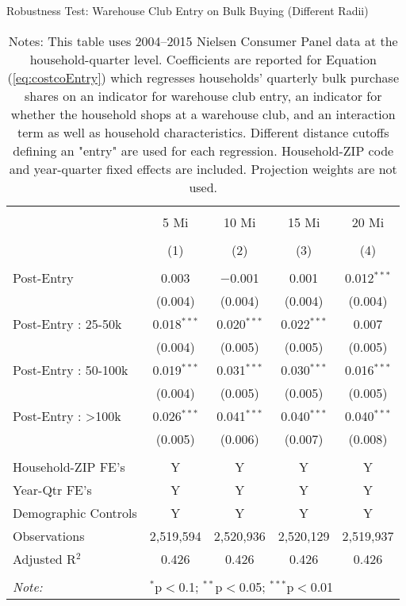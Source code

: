 \begin{table}[!htbp] \centering
  \caption{Robustness Test: Warehouse Club Entry on Bulk Buying (Different Radii)}
  \label{tab:appendixCostcoEntryDifferentRadii}
\begin{tabular}{@{\extracolsep{5pt}}lcccc}
\\[-1.8ex]\hline
\hline \\[-1.8ex]
 & 5 Mi & 10 Mi & 15 Mi & 20 Mi \\
\\[-1.8ex] & (1) & (2) & (3) & (4)\\
\hline \\[-1.8ex]
 Post-Entry & 0.003 & $-$0.001 & 0.001 & 0.012$^{***}$ \\
  & (0.004) & (0.004) & (0.004) & (0.004) \\
  Post-Entry : 25-50k & 0.018$^{***}$ & 0.020$^{***}$ & 0.022$^{***}$ & 0.007 \\
  & (0.004) & (0.005) & (0.005) & (0.005) \\
  Post-Entry : 50-100k & 0.019$^{***}$ & 0.031$^{***}$ & 0.030$^{***}$ & 0.016$^{***}$ \\
  & (0.004) & (0.005) & (0.005) & (0.005) \\
  Post-Entry : >100k & 0.026$^{***}$ & 0.041$^{***}$ & 0.040$^{***}$ & 0.040$^{***}$ \\
  & (0.005) & (0.006) & (0.007) & (0.008) \\
 \hline \\[-1.8ex]
Household-ZIP FE's & Y & Y & Y & Y \\
Year-Qtr FE's & Y & Y & Y & Y \\
Demographic Controls & Y & Y & Y & Y \\
Observations & 2,519,594 & 2,520,936 & 2,520,129 & 2,519,937 \\
Adjusted R$^{2}$ & 0.426 & 0.426 & 0.426 & 0.426 \\
\hline
\hline \\[-1.8ex]
\textit{Note:}  & \multicolumn{4}{l}{$^{*}$p$<$0.1; $^{**}$p$<$0.05; $^{***}$p$<$0.01} \\
\end{tabular}
\caption*{Notes: This table uses 2004--2015 Nielsen Consumer Panel data at the household-quarter level. Coefficients are reported for Equation (\ref{eq:costcoEntry}) which regresses households' quarterly bulk purchase shares on an indicator for warehouse club entry, an indicator for whether the household shops at a warehouse club, and an interaction term as well as household characteristics. Different distance cutoffs defining an "entry" are used for each regression. Household-ZIP code and year-quarter fixed effects are included. Projection weights are not used.}
\end{table}
